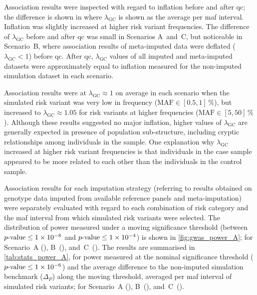 %

%

Association results were inspected with regard to inflation before and after \gls{qc}; the difference is shown in  where $\lambda_\text{GC}$ is shown as the average per \gls{maf} interval.
Inflation was slightly increased at higher risk variant frequencies.
The difference of $\lambda_\text{GC}$ before and after \gls{qc} was small in Scenarios A~and~C, but noticeable in Scenario~B, where association results of meta-imputed data were deflated (${\lambda_\text{GC} < 1}$) before \gls{qc}.
After \gls{qc}, $\lambda_\text{GC}$ values of all imputed and meta-imputed datasets were approximately equal to inflation measured for the non-imputed simulation dataset in each scenario.

Association results were at ${\lambda_\text{GC} \approx 1}$ on average in each scenario when the simulated risk variant was very low in frequency (${\text{MAF} \in [0.5, 1]\,\%}$), but increased to ${\lambda_\text{GC} \approx 1.05}$ for risk variants at higher frequencies (${\text{MAF} \in [5, 50]\,\%}$).
Although these results suggested no major inflation, higher values of $\lambda_\text{GC}$ are generally expected in presence of population sub-structure, including cryptic relationships among individuals in the sample.
One explanation why $\lambda_\text{GC}$ increased at higher risk variant frequencies is that individuals in the case sample appeared to be more related to each other than the individuals in the control sample.

%

%

%

%

Association results for each imputation strategy (referring to results obtained on genotype data imputed from available reference panels and meta-imputation) were separately evaluated with regard to each combination of risk category and the \gls{maf} interval from which simulated risk variants were selected.
The distribution of power measured under a moving significance threshold (between ${\mbox{$p$-value}\leq1\times10^{-8}}$ and ${\mbox{$p$-value}\leq1\times10^{-4}}$) is shown in \cref{fig:gwas_power_A}; for Scenario~A (), B~(), and~C~().
The results are summarised in \cref{tab:stats_power_A}, for power measured at the nominal significance threshold (${\mbox{$p$-value}\leq1\times10^{-6}}$) and the average difference to the non-imputed simulation benchmark ($\Delta_P$) along the moving threshold, averaged per \gls{maf} interval of simulated risk variants; for Scenario~A (), B~(), and~C~().

